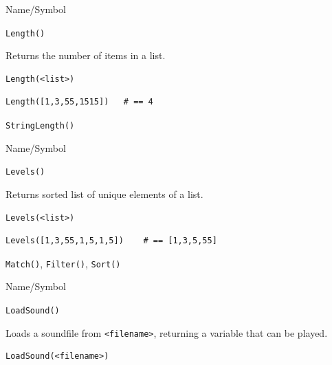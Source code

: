\begin{desc}{Name/Symbol}
\item[Name/Symbol]	\verb+Length()+

\item[Description]	Returns the number of items in a list.

\item[Usage]
\begin{verbatim}
Length(<list>)
\end{verbatim}

\item[Example]
\begin{verbatim}
Length([1,3,55,1515])	# == 4
\end{verbatim}

\item[See Also]	\verb+StringLength()+
\end{desc}

\begin{desc}{Name/Symbol}
\item[Name/Symbol]	\verb+Levels()+

\item[Description]	Returns sorted list of unique elements of a list.

\item[Usage]
\begin{verbatim}
Levels(<list>)
\end{verbatim}

\item[Example]
\begin{verbatim}
Levels([1,3,55,1,5,1,5])	# == [1,3,5,55]
\end{verbatim}

\item[See Also]	\verb+Match()+, \verb+Filter()+, \verb+Sort()+
\end{desc}



\begin{desc}{Name/Symbol}
\item[Name/Symbol]	\verb+LoadSound()+

\item[Description]	Loads a soundfile from \verb+<filename>+, 
		returning a variable that can be played.

\item[Usage]
\begin{verbatim}
LoadSound(<filename>)
\end{verbatim}

\item[Example]	

\item[See Also]	
\end{desc}


